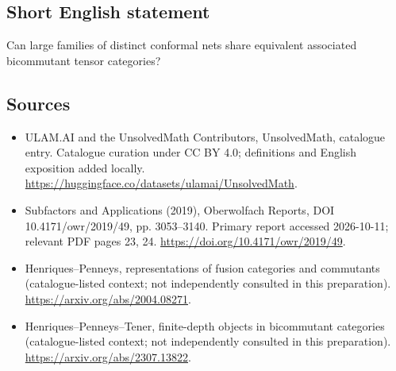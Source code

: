 \documentclass[11pt]{article}
\begin{document}
\subsection{Short English statement}
Can large families of distinct conformal nets share equivalent associated bicommutant tensor categories?
\subsection{Sources}
\begin{itemize}
\item[\hypertarget{source:statement:1}{S1}] ULAM.AI and the UnsolvedMath Contributors, UnsolvedMath, catalogue entry. Catalogue curation under CC BY 4.0; definitions and English exposition added locally.
\url{https://huggingface.co/datasets/ulamai/UnsolvedMath}.
\item[\hypertarget{source:statement:2}{S2}] Subfactors and Applications (2019), Oberwolfach Reports, DOI 10.4171/owr/2019/49, pp. 3053--3140. Primary report accessed 2026-10-11; relevant PDF pages 23, 24.
\url{https://doi.org/10.4171/owr/2019/49}.
\item[\hypertarget{source:statement:3}{S3}] Henriques--Penneys, representations of fusion categories and commutants (catalogue-listed context; not independently consulted in this preparation).
\url{https://arxiv.org/abs/2004.08271}.
\item[\hypertarget{source:statement:4}{S4}] Henriques--Penneys--Tener, finite-depth objects in bicommutant categories (catalogue-listed context; not independently consulted in this preparation).
\url{https://arxiv.org/abs/2307.13822}.
\end{itemize}
\label{end:statement}
\end{document}

